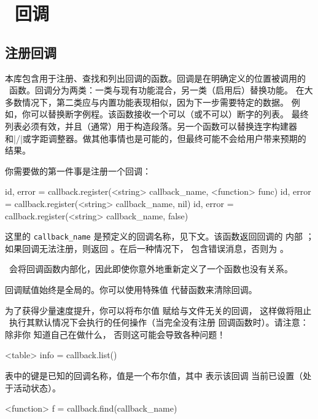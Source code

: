 \chapter{\LUA\ 回调}\label{callbacks}

\section{注册回调}



本库包含用于注册、查找和列出回调的函数。回调是在明确定义的位置被调用的
\LUA\ 函数。回调分为两类：一类与现有功能混合，另一类（启用后）替换功能。
在大多数情况下，第二类应与内置功能表现相似，因为下一步需要特定的数据。
例如，你可以替换断字例程。该函数接收一个可以（或不可以）断字的列表。
最终列表必须有效，并且（通常）用于构造段落。另一个函数可以替换连字构建器
和|/|或字距调整器。做其他事情也是可能的，但最终可能不会给用户带来预期的结果。

你需要做的第一件事是注册一个回调：

\begin{typing}
id, error =
    callback.register(<string> callback_name, <function> func)
id, error =
    callback.register(<string> callback_name, nil)
id, error =
    callback.register(<string> callback_name, false)
\end{typing}

这里的 \texttt{callback\_name} 是预定义的回调名称，见下文。该函数返回回调的
内部 ；如果回调无法注册，则返回 。在后一种情况下，
 包含错误消息，否则为 。

\LUATEX\ 会将回调函数内部化，因此即使你意外地重新定义了一个函数也没有关系。

回调赋值始终是全局的。你可以使用特殊值  代替函数来清除回调。

为了获得少量速度提升，你可以将布尔值  赋给与文件无关的回调，
这样做将阻止 \LUATEX\ 执行其默认情况下会执行的任何操作（当完全没有注册
回调函数时）。请注意：除非你 知道自己在做什么，
否则这可能会导致各种问题！

\begin{typing}
<table> info =
    callback.list()
\end{typing}

表中的键是已知的回调名称，值是一个布尔值，其中  表示该回调
当前已设置（处于活动状态）。

\begin{typing}
<function> f = callback.find(callback_name)
\end{typing}

